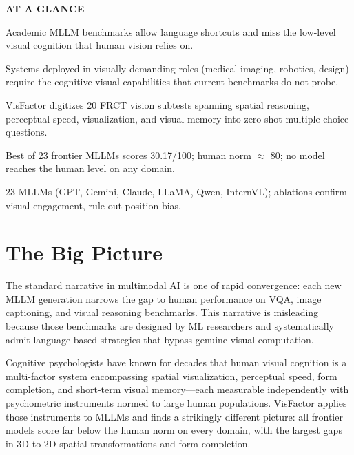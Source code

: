 \documentclass[10pt,twocolumn]{article}
\begin{document}
\begin{mdframed}[backgroundcolor=boxgray,linecolor=rulered,linewidth=1pt,
    innerleftmargin=6pt,innerrightmargin=6pt,
    innertopmargin=6pt,innerbottommargin=6pt]
\textbf{\small AT A GLANCE}\par\vspace{4pt}
\begin{description}[leftmargin=0pt,labelsep=4pt,itemsep=2pt,parsep=0pt,
    font=\small\bfseries]
  \item[Problem:] Academic MLLM benchmarks allow language shortcuts and
    miss the low-level visual cognition that human vision relies on.
  \item[Why it matters:] Systems deployed in visually demanding roles
    (medical imaging, robotics, design) require the cognitive visual
    capabilities that current benchmarks do not probe.
  \item[Method:] VisFactor digitizes 20 FRCT vision subtests spanning
    spatial reasoning, perceptual speed, visualization, and visual memory
    into zero-shot multiple-choice questions.
  \item[Result:] Best of 23 frontier MLLMs scores 30.17/100; human
    norm $\approx$ 80; no model reaches the human level on any domain.
  \item[Evidence:] 23 MLLMs (GPT, Gemini, Claude, LLaMA, Qwen, InternVL);
    ablations confirm visual engagement, rule out position bias.
\end{description}
\end{mdframed}

\section{The Big Picture}

The standard narrative in multimodal AI is one of rapid convergence: each
new MLLM generation narrows the gap to human performance on VQA, image
captioning, and visual reasoning benchmarks. This narrative is misleading
because those benchmarks are designed by ML researchers and systematically
admit language-based strategies that bypass genuine visual computation.

Cognitive psychologists have known for decades that human visual cognition
is a multi-factor system encompassing spatial visualization, perceptual
speed, form completion, and short-term visual memory---each measurable
independently with psychometric instruments normed to large human populations.
VisFactor applies those instruments to MLLMs and finds a strikingly different
picture: all frontier models score far below the human norm on every domain,
with the largest gaps in 3D-to-2D spatial transformations and form completion.
\end{document}
